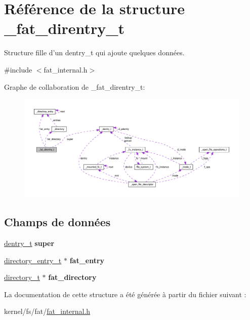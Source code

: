 \hypertarget{struct__fat__direntry__t}{\section{Référence de la structure \-\_\-fat\-\_\-direntry\-\_\-t}
\label{struct__fat__direntry__t}
}


Structure fille d'un dentry\-\_\-t qui ajoute quelques données.  




{\ttfamily \#include $<$fat\-\_\-internal.\-h$>$}



Graphe de collaboration de \-\_\-fat\-\_\-direntry\-\_\-t\-:\nopagebreak
\begin{figure}[H]
\begin{center}
\leavevmode
\includegraphics[width=350pt]{struct__fat__direntry__t__coll__graph}
\end{center}
\end{figure}
\subsection*{Champs de données}
\begin{DoxyCompactItemize}
\item 
\hypertarget{struct__fat__direntry__t_ad5c26f850433d9c813f416d3b5325b62}{\hyperlink{vfs_8h_ade5c998c6b3f09d2cf45d0e5ef8787da}{dentry\-\_\-t} {\bfseries super}}\label{struct__fat__direntry__t_ad5c26f850433d9c813f416d3b5325b62}

\item 
\hypertarget{struct__fat__direntry__t_a17b9dd242e07822ff9bc98a6a46e8c9e}{\hyperlink{fat__internal_8h_ab6546cb0abf935a615fae20884a41818}{directory\-\_\-entry\-\_\-t} $\ast$ {\bfseries fat\-\_\-entry}}\label{struct__fat__direntry__t_a17b9dd242e07822ff9bc98a6a46e8c9e}

\item 
\hypertarget{struct__fat__direntry__t_a15f0a5d5dcfd4fac4dbc9c3c976b33df}{\hyperlink{fat__internal_8h_a04e3d213fd143d58bbabf68062bdc21c}{directory\-\_\-t} $\ast$ {\bfseries fat\-\_\-directory}}\label{struct__fat__direntry__t_a15f0a5d5dcfd4fac4dbc9c3c976b33df}

\end{DoxyCompactItemize}


La documentation de cette structure a été générée à partir du fichier suivant \-:\begin{DoxyCompactItemize}
\item 
kernel/fs/fat/\hyperlink{fat__internal_8h}{fat\-\_\-internal.\-h}\end{DoxyCompactItemize}
